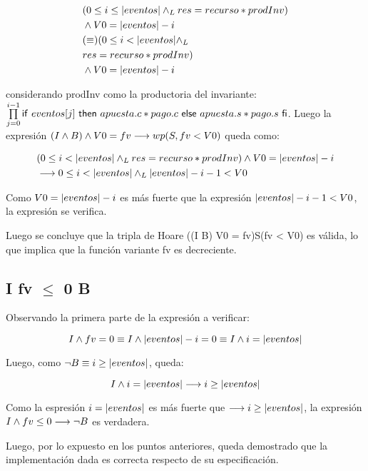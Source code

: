 \documentclass[10pt,a4paper]{article}
\begin{document}
 \begin{equation}
	\begin{split}
		& (0 \leq i \leq \longitud{eventos} \yLuego res = recurso * prodInv)\\
		& \land V0 = \longitud{eventos} - i\\

		& (\equiv) (0 \leq i < \longitud{eventos} \yLuego\\
		& res = recurso * prodInv)\\
		& \land V0 = \longitud{eventos} - i
	\end{split}
	\end{equation}
 
 considerando prodInv como la productoria del invariante: $\prod\limits_{j=0}^{i-1} \mathsf{if}\ eventos[j]\ \mathsf{then}\ apuesta.c * pago.c\ \mathsf{else}\ apuesta.s * pago.s\ \mathsf{fi}$.
 Luego la expresión $(I \land B) \land V0 = fv \longrightarrow wp(S,fv < V0)$ queda como:

\begin{equation}
\begin{split}
	& (0 \leq i < |eventos| \land _L res = recurso * prodInv) \land V0 = |eventos| - i\\
	& \longrightarrow 0 \leq i < |eventos| \land _L |eventos| -i - 1 < V0
\end{split}
\end{equation}

 Como $V0 = |eventos| - i$ es más fuerte que la expresión $|eventos| -i - 1 < V0$, la expresión se verifica.

\vspace{0.3cm}

 Luego se concluye que la tripla de Hoare ((I \land B) \land V0 = fv)S(fv < V0) es válida, lo que implica
 que la función variante fv es decreciente.

\subsection{I \land fv $\leq$ 0 \implica \neg B}

 Observando la primera parte de la expresión a verificar:
 
\begin{equation}
	I \land fv=0 \equiv I \land |eventos| - i = 0 \equiv I \land i = |eventos|
\end{equation}

 Luego, como $\neg B \equiv i \geq |eventos|$, queda:

\begin{equation}
	I \land i = |eventos| \longrightarrow i \geq |eventos|
\end{equation}

 Como la espresión $i = |eventos|$ es más fuerte que $\longrightarrow i \geq |eventos|$,
 la expresión $I \land fv \leq 0 \longrightarrow \neg B$ es verdadera.

 Luego, por lo expuesto en los puntos anteriores, queda demostrado que la implementación dada es correcta respecto de su especificación.
\end{document}
